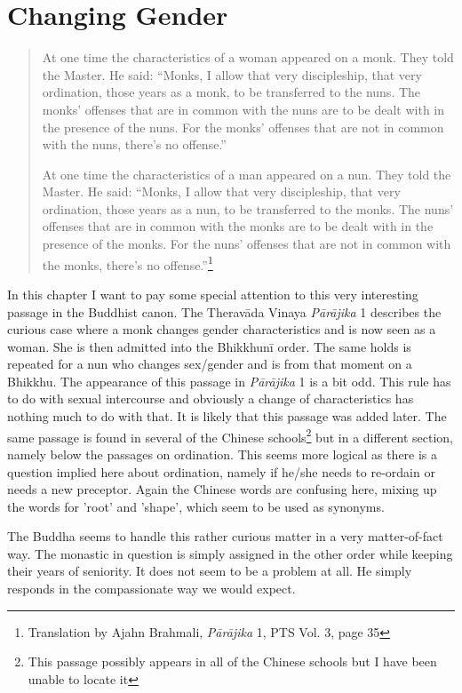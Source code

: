 \section{Changing Gender}

\begin{quote}
At one time the characteristics of a woman appeared on a monk. They told the Master. He said: “Monks, I allow that very discipleship, that very ordination, those years as a monk, to be transferred to the nuns. The monks’ offenses that are in common with the nuns are to be dealt with in the presence of the nuns. For the monks’ offenses that are not in common with the nuns, there’s no offense.”

At one time the characteristics of a man appeared on a nun. They told the Master. He said: “Monks, I allow that very discipleship, that very ordination, those years as a nun, to be transferred to the monks. The nuns’ offenses that are in common with the monks are to be dealt with in the presence of the monks. For the nuns’ offenses that are not in common with the monks, there’s no offense.”\footnote{Translation by Ajahn Brahmali, {\em Pā­rāji­ka} 1, PTS Vol. 3, page 35}
\end{quote}

In this chapter I want to pay some special attention to this very interesting passage in the Buddhist canon. The Theravāda Vinaya {\em Pā­rāji­ka} 1 describes the curious case where a monk changes gender characteristics and is now seen as a woman. She is then admitted into the Bhikkhunī order. The same holds is repeated for a nun who changes sex/gender and is from that moment on a Bhikkhu. The appearance of this passage in {\em Pārājika} 1 is a bit odd. This rule has to do with sexual intercourse and obviously a change of characteristics has nothing much to do with that. It is likely that this passage was added later. The same passage is found in several of the Chinese schools\footnote{This passage possibly appears in all of the Chinese schools but I have been unable to locate it} but in a different section, namely below the passages on ordination. This seems more logical as there is a question implied here about ordination, namely if he/she needs to re-ordain or needs a new preceptor. Again the Chinese words are confusing here, mixing up the words for 'root' and 'shape', which seem to be used as synonyms.

The Buddha seems to handle this rather curious matter in a very matter-of-fact way. The monastic in question is simply assigned in the other order while keeping their years of seniority. It does not seem to be a problem at all. He simply responds in the compassionate way we would expect.

